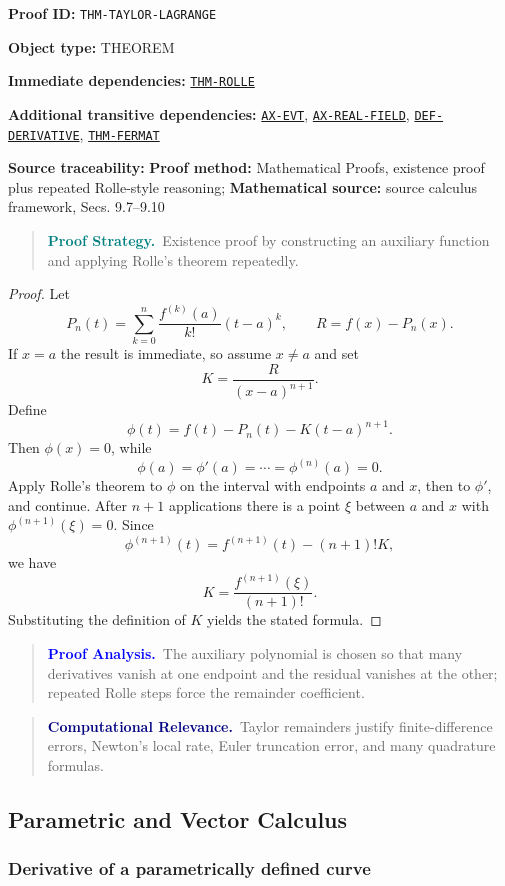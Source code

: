 \documentclass[10pt]{article}
\newcommand{\pidraw}[1]{\begingroup\urlstyle{tt}\nolinkurl{#1}\endgroup}
\newcommand{\pidref}[1]{\hyperref[prf:#1]{\pidraw{#1}}}
\theoremstyle{definition}
\theoremstyle{remark}
\newenvironment{proofstrategy}
{\begin{quote}\small\noindent\textbf{\textcolor{teal}{Proof Strategy.}}\ }
{\end{quote}}
\newenvironment{proofanalysis}
{\begin{quote}\small\noindent\textbf{\textcolor{blue}{Proof Analysis.}}\ }
{\end{quote}}
\newenvironment{computationalrelevance}
{\begin{quote}\small\noindent\textbf{\textcolor{navy}{Computational Relevance.}}\ }
{\end{quote}}
\newcommand{\meta}[2]{\noindent\textbf{#1:} #2\par}
\begin{document}
\meta{Proof ID}{\pidraw{THM-TAYLOR-LAGRANGE}}
\meta{Object type}{THEOREM}
\meta{Immediate dependencies}{\pidref{THM-ROLLE}}
\meta{Additional transitive dependencies}{\pidref{AX-EVT}, \pidref{AX-REAL-FIELD}, \pidref{DEF-DERIVATIVE}, \pidref{THM-FERMAT}}
\meta{Source traceability}{\textbf{Proof method:} Mathematical Proofs, existence proof plus repeated Rolle-style reasoning; \textbf{Mathematical source:} source calculus framework, Secs. 9.7--9.10}

\begin{proofstrategy}Existence proof by constructing an auxiliary function and applying Rolle's theorem repeatedly.\end{proofstrategy}

\begin{proof}

Let
\[
P_n(t)=\sum_{k=0}^{n}\frac{f^{(k)}(a)}{k!}(t-a)^k,
\qquad
R=f(x)-P_n(x).
\]
If $x=a$ the result is immediate, so assume $x\ne a$ and set
\[
K=\frac{R}{(x-a)^{n+1}}.
\]
Define
\[
\phi(t)=f(t)-P_n(t)-K(t-a)^{n+1}.
\]
Then $\phi(x)=0$, while
\[
\phi(a)=\phi'(a)=\cdots=\phi^{(n)}(a)=0.
\]
Apply Rolle's theorem to $\phi$ on the interval with endpoints $a$ and $x$,
then to $\phi'$, and continue. After $n+1$ applications there is a point
$\xi$ between $a$ and $x$ with $\phi^{(n+1)}(\xi)=0$. Since
\[
\phi^{(n+1)}(t)=f^{(n+1)}(t)-(n+1)!K,
\]
we have
\[
K=\frac{f^{(n+1)}(\xi)}{(n+1)!}.
\]
Substituting the definition of $K$ yields the stated formula.

\end{proof}

\begin{proofanalysis}The auxiliary polynomial is chosen so that many derivatives vanish at one endpoint and the residual vanishes at the other; repeated Rolle steps force the remainder coefficient.\end{proofanalysis}

\begin{computationalrelevance}Taylor remainders justify finite-difference errors, Newton's local rate, Euler truncation error, and many quadrature formulas.\end{computationalrelevance}

\subsection{Parametric and Vector Calculus}

\subsubsection{Derivative of a parametrically defined curve}
\end{document}
